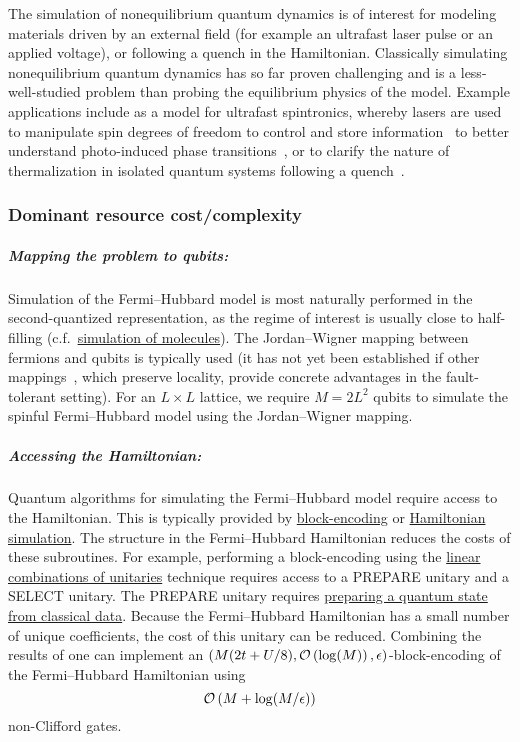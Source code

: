 \begin{refsection}
The simulation of nonequilibrium quantum dynamics is of interest for modeling materials driven by an external field (for example an ultrafast laser pulse or an applied voltage), or following a quench in the Hamiltonian. Classically simulating nonequilibrium quantum dynamics has so far proven challenging and is a less-well-studied problem than probing the equilibrium physics of the model. Example applications include as a model for ultrafast spintronics, whereby lasers are used to manipulate spin degrees of freedom to control and store information~\cite{zutic2004Spintronics} to better understand photo-induced phase transitions~\cite{oka2019FermiHubbardDynamics}, or to clarify the nature of thermalization in isolated quantum systems following a quench~\cite{polkovnikov2011NonEquilibriumDynamics}.











\subsubsection*{Dominant resource cost/complexity}

\subparagraph{Mapping the problem to qubits:} 
Simulation of the Fermi--Hubbard model is most naturally performed in the second-quantized representation, as the regime of interest is usually close to half-filling (c.f.~\hyperref[appl:QuantumChemistry]{simulation of molecules}). The Jordan--Wigner mapping between fermions and qubits is typically used (it has not yet been established if other mappings~\cite{verstraete2005mapping,derby2021CompactMapping}, which preserve locality, provide concrete advantages in the fault-tolerant setting). For an $L \times L$ lattice, we require $M = 2L^2$ qubits to simulate the spinful Fermi--Hubbard model using the Jordan--Wigner mapping.


\subparagraph{Accessing the Hamiltonian:} 
Quantum algorithms for simulating the Fermi--Hubbard model require access to the Hamiltonian. This is typically provided by \hyperref[prim:BlockEncodings]{block-encoding} or \hyperref[prim:HamiltonianSimulation]{Hamiltonian simulation}. The structure in the Fermi--Hubbard Hamiltonian reduces the costs of these subroutines. For example, performing a block-encoding using the \hyperref[prim:LCU]{linear combinations of unitaries} technique requires access to a PREPARE unitary and a SELECT unitary. The PREPARE unitary requires \hyperref[prim:StatePrepData]{preparing a quantum state from classical data}. Because the Fermi--Hubbard Hamiltonian has a small number of unique coefficients, the cost of this unitary can be reduced. Combining the results of \cite{babbush2018EncodingElectronicSpectraLinearT, yoshioka2022CondensedMatterSimulation, CampbellHubbard22} one can implement an $(M(2t+U/8), \mathcal{O}\left( \log(M) \right), \epsilon)$-block-encoding of the Fermi--Hubbard Hamiltonian using
\begin{equation}
    \mathcal{O}\left( M + \log(M/\epsilon) \right)
\end{equation}
non-Clifford gates. 


\end{refsection}
